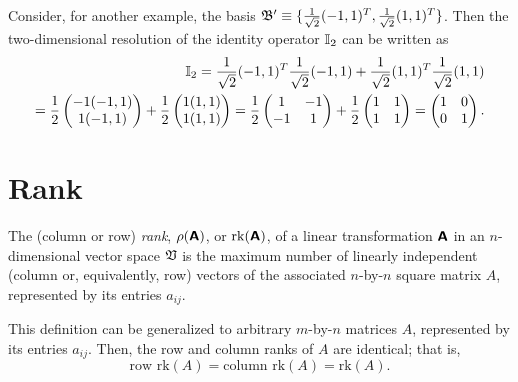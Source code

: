 {Consider, for another example, the basis
${\frak B}' \equiv \{\frac{1}{\sqrt{2}}(-1,1)^T,\frac{1}{\sqrt{2}}(1,1)^T\}$.
Then the two-dimensional resolution of the identity operator ${\Bbb I}_2$
can be written as
\begin{equation}
\begin{split}
{\Bbb I}_2 =  \frac{1}{\sqrt{2}}   (-1,1)^T  \frac{1}{\sqrt{2}}(-1,1) +   \frac{1}{\sqrt{2}}(1,1)^T \frac{1}{\sqrt{2}}(1,1)
\\
=
\frac{1}{{2}}
\begin{pmatrix}
-1 (-1,1) \\  1 (-1,1)
\end{pmatrix}
 +
\frac{1}{{2}}
\begin{pmatrix}
1 (1,1)\\
1 (1,1)
\end{pmatrix}
 =
\frac{1}{{2}}
\begin{pmatrix}
1 & -1 \\
-1 & 1
\end{pmatrix}
+
\frac{1}{{2}}
\begin{pmatrix}
1 & 1 \\
1 & 1
\end{pmatrix}
=
\begin{pmatrix}
1 & 0 \\
0 & 1
\end{pmatrix}
.
\end{split}
\end{equation}


\eexample
}


\section{Rank}
\label{2014-m-fdvs-rank}

The (column or row) {\em rank}, $\rho (  \textsf{\textbf{A}}  )$,
or $\textrm{rk} ( \textsf{\textbf{A}} )$,
of a linear transformation $ \textsf{\textbf{A}} $
in an $n$-dimensional vector space ${\frak V}$
is the maximum number of linearly independent (column or, equivalently,
row) vectors of the associated
$n$-by-$n$ square matrix $ A $, represented by its entries  $a_{ij}$.

This definition can be generalized to arbitrary
$m$-by-$n$ matrices $A$, represented by its entries  $a_{ij}$.
Then, the row and column ranks of $A$ are identical; that is,
\begin{equation}
\textrm{row rk} (A) =
\textrm{column rk} (A)  =
\textrm{rk} (A).
\end{equation}


